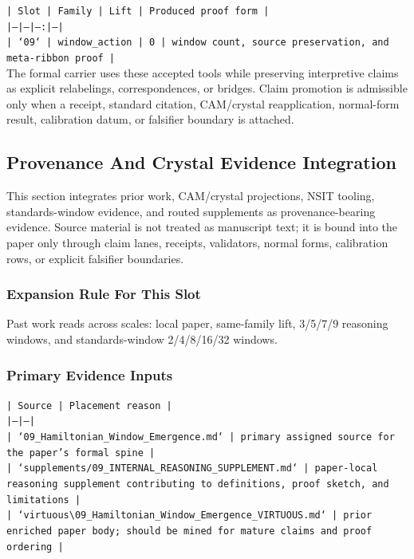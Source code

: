 \documentclass[11pt]{article}
\begin{document}
\noindent\texttt{| Slot | Family | Lift | Produced proof form |}\\
\noindent\texttt{|---|---|---:|---|}\\
\noindent\texttt{| `09` | window\_action | 0 | window count, source preservation, and meta-ribbon proof |}\\

The formal carrier uses these accepted tools while preserving interpretive
claims as explicit relabelings, correspondences, or bridges. Claim promotion is admissible only when a receipt, standard citation,
CAM/crystal reapplication, normal-form result, calibration datum, or falsifier
boundary is attached.

\subsection*{Provenance And Crystal Evidence Integration}

This section integrates prior work, CAM/crystal projections, NSIT tooling,
standards-window evidence, and routed supplements as provenance-bearing
evidence. Source material is not treated as manuscript text; it is bound into
the paper only through claim lanes, receipts, validators, normal forms,
calibration rows, or explicit falsifier boundaries.

\subsubsection*{Expansion Rule For This Slot}

Past work reads across scales: local paper, same-family lift, 3/5/7/9 reasoning windows, and standards-window 2/4/8/16/32 windows.

\subsubsection*{Primary Evidence Inputs}

\noindent\texttt{| Source | Placement reason |}\\
\noindent\texttt{|---|---|}\\
\noindent\texttt{| `09\_Hamiltonian\_Window\_Emergence.md` | primary assigned source for the paper's formal spine |}\\
\noindent\texttt{| `supplements/09\_INTERNAL\_REASONING\_SUPPLEMENT.md` | paper-local reasoning supplement contributing to definitions, proof sketch, and limitations |}\\
\noindent\texttt{| `virtuous\textbackslash{}09\_Hamiltonian\_Window\_Emergence\_VIRTUOUS.md` | prior enriched paper body; should be mined for mature claims and proof ordering |}\\
\end{document}
